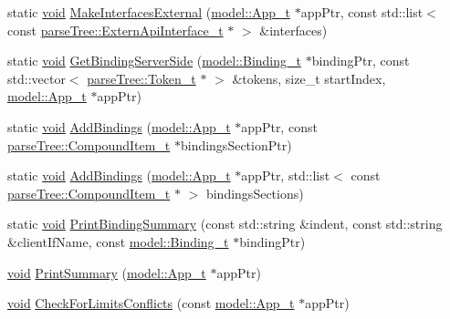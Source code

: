 \begin{DoxyCompactItemize}
\item 
static \hyperlink{_t_e_m_p_l_a_t_e__cdef_8h_ac9c84fa68bbad002983e35ce3663c686}{void} \hyperlink{namespacemodeller_aba7e4d1a8ab6c47ec8e37f13f56372fb}{Make\+Interfaces\+External} (\hyperlink{structmodel_1_1_app__t}{model\+::\+App\+\_\+t} $\ast$app\+Ptr, const std\+::list$<$ const \hyperlink{structparse_tree_1_1_extern_api_interface__t}{parse\+Tree\+::\+Extern\+Api\+Interface\+\_\+t} $\ast$ $>$ \&interfaces)
\item 
static \hyperlink{_t_e_m_p_l_a_t_e__cdef_8h_ac9c84fa68bbad002983e35ce3663c686}{void} \hyperlink{namespacemodeller_a0a2906c5c61076b0ab3c0aa5ab78c166}{Get\+Binding\+Server\+Side} (\hyperlink{structmodel_1_1_binding__t}{model\+::\+Binding\+\_\+t} $\ast$binding\+Ptr, const std\+::vector$<$ \hyperlink{structparse_tree_1_1_token__t}{parse\+Tree\+::\+Token\+\_\+t} $\ast$ $>$ \&tokens, size\+\_\+t start\+Index, \hyperlink{structmodel_1_1_app__t}{model\+::\+App\+\_\+t} $\ast$app\+Ptr)
\item 
static \hyperlink{_t_e_m_p_l_a_t_e__cdef_8h_ac9c84fa68bbad002983e35ce3663c686}{void} \hyperlink{namespacemodeller_a3375a44eccc7a5cd5f5ef0add0791728}{Add\+Bindings} (\hyperlink{structmodel_1_1_app__t}{model\+::\+App\+\_\+t} $\ast$app\+Ptr, const \hyperlink{structparse_tree_1_1_compound_item__t}{parse\+Tree\+::\+Compound\+Item\+\_\+t} $\ast$bindings\+Section\+Ptr)
\item 
static \hyperlink{_t_e_m_p_l_a_t_e__cdef_8h_ac9c84fa68bbad002983e35ce3663c686}{void} \hyperlink{namespacemodeller_ac7d5314616e753956166c12b129f89f8}{Add\+Bindings} (\hyperlink{structmodel_1_1_app__t}{model\+::\+App\+\_\+t} $\ast$app\+Ptr, std\+::list$<$ const \hyperlink{structparse_tree_1_1_compound_item__t}{parse\+Tree\+::\+Compound\+Item\+\_\+t} $\ast$ $>$ bindings\+Sections)
\item 
static \hyperlink{_t_e_m_p_l_a_t_e__cdef_8h_ac9c84fa68bbad002983e35ce3663c686}{void} \hyperlink{namespacemodeller_a948ebbe6dcf2fc26a5ebd5c0392ce582}{Print\+Binding\+Summary} (const std\+::string \&indent, const std\+::string \&client\+If\+Name, const \hyperlink{structmodel_1_1_binding__t}{model\+::\+Binding\+\_\+t} $\ast$binding\+Ptr)
\item 
\hyperlink{_t_e_m_p_l_a_t_e__cdef_8h_ac9c84fa68bbad002983e35ce3663c686}{void} \hyperlink{namespacemodeller_a6e88f789dd10c16ef5608b79c91e0901}{Print\+Summary} (\hyperlink{structmodel_1_1_app__t}{model\+::\+App\+\_\+t} $\ast$app\+Ptr)
\item 
\hyperlink{_t_e_m_p_l_a_t_e__cdef_8h_ac9c84fa68bbad002983e35ce3663c686}{void} \hyperlink{namespacemodeller_a0bbdccd168d760be7be505bae4badb6f}{Check\+For\+Limits\+Conflicts} (const \hyperlink{structmodel_1_1_app__t}{model\+::\+App\+\_\+t} $\ast$app\+Ptr)

\end{DoxyCompactItemize}
